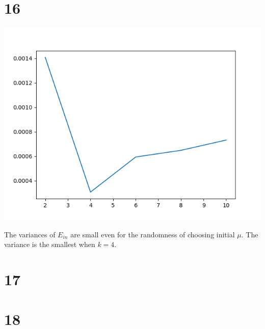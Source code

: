 \documentclass[12pt]{article}
\begin{document}
\section*{16}
\begin{center}
    \includegraphics[scale=0.5]{p16.png}
\end{center}
The variances of $E_{in}$ are small even for the randomness of choosing initial $\mu$.
The variance is the smallest when $k=4$.
\section*{17}
\section*{18}
\end{document}
